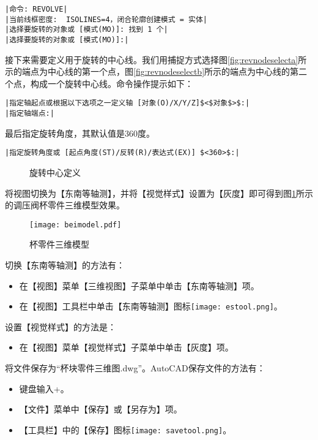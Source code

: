 \begin{procedure}
\begin{lstlisting}
|命令: REVOLVE|
|当前线框密度:  ISOLINES=4，闭合轮廓创建模式 = 实体|
|选择要旋转的对象或 [模式(MO)]: 找到 1 个|
|选择要旋转的对象或 [模式(MO)]:|
\end{lstlisting}
接下来需要定义用于旋转的中心线。我们用捕捉方式选择图\ref{fig:revnodeselecta}所示的端点为中心线的第一个点，图\ref{fig:revnodeselectb}所示的端点为中心线的第二个点，构成一个旋转中心线。命令操作提示如下：
\begin{lstlisting}
|指定轴起点或根据以下选项之一定义轴 [对象(O)/X/Y/Z]$<$对象$>$:|
|指定轴端点:|
\end{lstlisting}
最后指定旋转角度，其默认值是360度。
\begin{lstlisting}
|指定旋转角度或 [起点角度(ST)/反转(R)/表达式(EX)] $<360>$:|
\end{lstlisting}

\begin{figure}[htbp]
\centering
{}\hspace{30pt}
\caption{旋转中心定义}
\end{figure}
\item 将视图切换为【东南等轴测】，并将【视觉样式】设置为【灰度】即可得到图\ref{fig:beimodel}所示的调压阀杯零件三维模型效果。
\begin{figure}
\centering
\texttt{[image: beimodel.pdf]}
\caption{杯零件三维模型}\label{fig:beimodel}
\end{figure}
切换【东南等轴测】的方法有：
\begin{itemize}
\item 在【视图】菜单【三维视图】子菜单中单击【东南等轴测】项。
\item 在【视图】工具栏中单击【东南等轴测】图标\texttt{[image: estool.png]}。
\end{itemize}
设置【视觉样式】的方法是：
\begin{itemize}
\item 在【视图】菜单【视觉样式】子菜单中单击【灰度】项。
\end{itemize}
\item 将文件保存为“杯块零件三维图.dwg”。AutoCAD保存文件的方法有：
\begin{itemize}
\item 键盘输入+。
\item 【文件】菜单中【保存】或【另存为】项。
\item 【工具栏】中的【保存】图标\texttt{[image: savetool.png]}。
\end{itemize}
\end{procedure}
